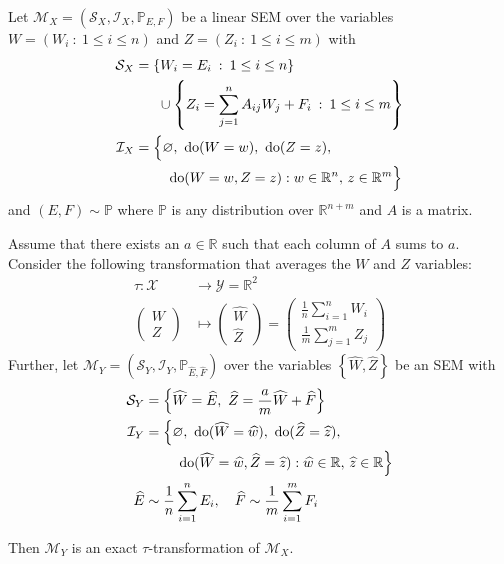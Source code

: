 \begin{theorem}\label{theorem:micro-macro}
Let ${\mathcal{M}_X = \left(\mathcal{S}_X, \mathcal{I}_X, \mathbb{P}_{E,F} \right)}$ be a linear SEM over the variables ${W=\left( W_i \: : \: 1\leq  i \leq n \right)}$ and ${Z=\left( Z_i \: : \: 1\leq  i \leq m \right)}$ with
%
\begin{align*}
\mathcal{S}_X &= \left\lbrace W_i = E_i \:  : \: 1 \leq i \leq n  \right\rbrace \\
& \quad \ \  \cup \left\lbrace Z_i = \sum_{j=1}^n A_{ij}W_j  + F_{i} \:  : \: 1\leq i \leq m \right\rbrace \\
%
\mathcal{I}_X &= \Big{\{} \nulli, \ \doop(W= w), \ \doop(Z= z), \\
& \qquad\ \doop(W= w, Z= z ) :   w \in \mathbb{R}^{n}, \, z \in \mathbb{R}^m \Big{\}}
%
\end{align*}
%
and $(E,F)  \sim \mathbb{P}$ where $\mathbb{P}$ is any distribution over $\mathbb{R}^{n+m}$ and $A$ is a matrix.

Assume that there exists an $a\in \mathbb{R}$ such that each column of $A$ sums to $a$. Consider the following transformation that averages the $W$ and $Z$ variables:
%
\begin{align*}
\tau : \mathcal{X} &\rightarrow \mathcal{Y} = \mathbb{R}^2 \\
\begin{pmatrix} W \\ Z \end{pmatrix} &\mapsto \begin{pmatrix} \widehat{W} \\ \widehat{Z} \end{pmatrix} = \begin{pmatrix} \frac{1}{n}\sum_{i=1}^n W_i \\ \frac{1}{m}\sum_{j=1}^m Z_j  \end{pmatrix}
\end{align*}
%
Further, let $\mathcal{M}_Y = \left(\mathcal{S}_Y, \mathcal{I}_Y, \mathbb{P}_{\widehat{E},\widehat{F}} \right)$ over the variables ${\left\lbrace \widehat{W}, \widehat{Z} \right\rbrace}$ be an SEM with
%
\begin{align*}
\mathcal{S}_Y &= \Big\lbrace \widehat{W} = \widehat{E}, \ \widehat{Z} = \frac{a}{m}\widehat{W} + \widehat{F} \Big\rbrace \\
%
\mathcal{I}_Y &= \Big{\{} \nulli,\ \doop(\widehat{W}= \widehat{w}), \ \doop(\widehat{Z}= \widehat{z}), \\
& \qquad\ \doop(\widehat{W}= \widehat{w}, \widehat{Z}= \widehat{z} ) :   \widehat{w} \in \mathbb{R}, \, \widehat{z} \in \mathbb{R} \Big{\}} \\
%
\widehat{E}  & \sim \frac{1}{n}\sum_{i=1}^{n} E_i, \quad
\widehat{F}  \sim \frac{1}{m}\sum_{i=1}^{m} F_i
\end{align*}

Then $\mathcal{M}_Y$ is an exact $\tau$-transformation of $\mathcal{M}_X$.
\end{theorem}

